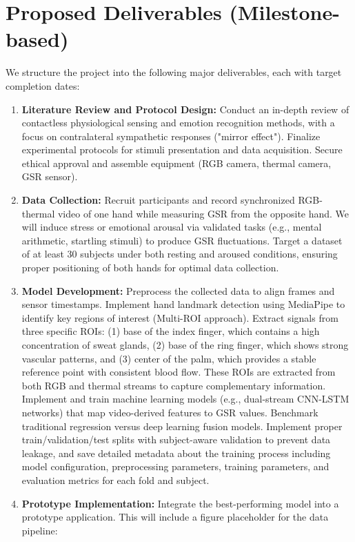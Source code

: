 \documentclass[12pt]{article}
\begin{document}
    \section{Proposed Deliverables (Milestone-based)}
    We structure the project into the following major deliverables, each with target completion dates:
    \begin{enumerate}
        \item \textbf{Literature Review and Protocol Design:} Conduct an in-depth review of contactless physiological sensing and emotion recognition methods, with a focus on contralateral sympathetic responses ("mirror effect"). Finalize experimental protocols for stimuli presentation and data acquisition. Secure ethical approval and assemble equipment (RGB camera, thermal camera, GSR sensor).
        \item \textbf{Data Collection:} Recruit participants and record synchronized RGB-thermal video of one hand while measuring GSR from the opposite hand. We will induce stress or emotional arousal via validated tasks (e.g., mental arithmetic, startling stimuli) to produce GSR fluctuations. Target a dataset of at least 30 subjects under both resting and aroused conditions, ensuring proper positioning of both hands for optimal data collection.
        \item \textbf{Model Development:} Preprocess the collected data to align frames and sensor timestamps. Implement hand landmark detection using MediaPipe to identify key regions of interest (Multi-ROI approach). Extract signals from three specific ROIs: (1) base of the index finger, which contains a high concentration of sweat glands, (2) base of the ring finger, which shows strong vascular patterns, and (3) center of the palm, which provides a stable reference point with consistent blood flow. These ROIs are extracted from both RGB and thermal streams to capture complementary information. Implement and train machine learning models (e.g., dual-stream CNN-LSTM networks) that map video-derived features to GSR values. Benchmark traditional regression versus deep learning fusion models. Implement proper train/validation/test splits with subject-aware validation to prevent data leakage, and save detailed metadata about the training process including model configuration, preprocessing parameters, training parameters, and evaluation metrics for each fold and subject.
        \item \textbf{Prototype Implementation:} Integrate the best-performing model into a prototype application. This will include a figure placeholder for the data pipeline:

\end{enumerate}
\end{document}
